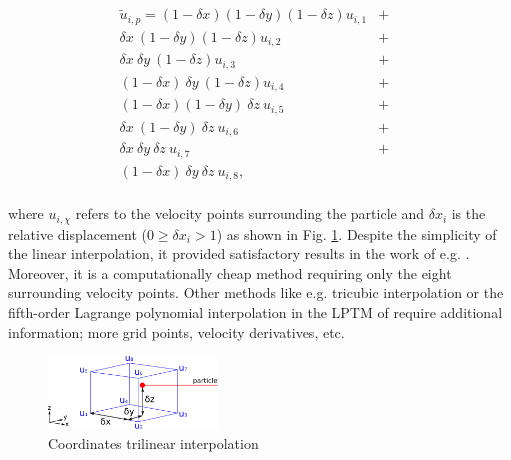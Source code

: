 \documentclass[twoside,a4paper]{report}
\begin{document}
\begin{eqnarray}
 \widetilde{u}_{i,p} = (1-\delta x)(1-\delta y)(1-\delta z)    u_{i,1}    &+&               \\
                          \delta x \: (1-\delta y)(1-\delta z) u_{i,2}    &+&               \nonumber \\
                          \delta x \: \delta y \: (1-\delta z) u_{i,3}    &+&               \nonumber \\
                      (1-\delta x) \: \delta y \: (1-\delta z) u_{i,4}    &+&               \nonumber \\
                      (1-\delta x)(1-\delta y) \: \delta z \:  u_{i,5}    &+&               \nonumber \\
                      \delta x \: (1-\delta y) \: \delta z \:  u_{i,6}    &+&               \nonumber \\
                      \delta x \: \delta y \: \delta z \:      u_{i,7}    &+&               \nonumber \\
                      (1-\delta x) \: \delta y \: \delta z \:  u_{i,8},                     \nonumber \\
\end{eqnarray}

where $u_{i,\chi}$ refers to the velocity points surrounding the particle and $\delta x_i$ is the relative displacement ($0 \geq \delta x_i > 1 $) as shown in Fig. \ref{fig:trilinear}. Despite the simplicity of the linear interpolation, it provided satisfactory results in the work of e.g. \cite{heus2008,verzijlbergh2009}. Moreover, it is a computationally cheap method requiring only the eight surrounding velocity points. Other methods like e.g. tricubic interpolation \citep[see][for a supposedly efficient method]{lekien2005} or the fifth-order Lagrange polynomial interpolation in the LPTM of \cite{yamaguchi2012} require additional information; more grid points, velocity derivatives, etc. 

\begin{figure}
  \begin{center}
    \includegraphics[width=0.40\textwidth]{figures_LPTM/trilinear.pdf}
    \caption{Coordinates trilinear interpolation}
    \label{fig:trilinear}       %
  \end{center}
\end{figure}
\end{document}
